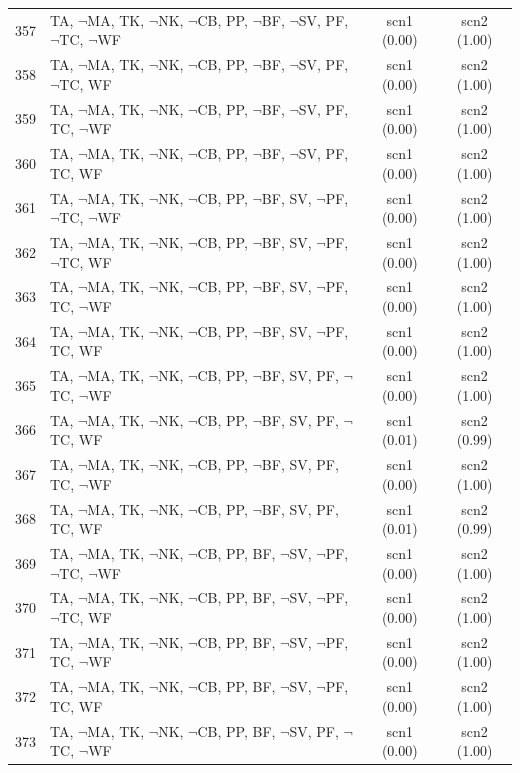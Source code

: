 \documentclass[12pt]{article}
\begin{document}
\begin{longtable}{|l|l|c|c|}
357 & TA, $\neg$MA, TK, $\neg$NK, $\neg$CB, PP, $\neg$BF, $\neg$SV, PF, $\neg$TC, $\neg$WF & scn1 (0.00) & scn2 (1.00)\\
358 & TA, $\neg$MA, TK, $\neg$NK, $\neg$CB, PP, $\neg$BF, $\neg$SV, PF, $\neg$TC, WF & scn1 (0.00) & scn2 (1.00)\\
359 & TA, $\neg$MA, TK, $\neg$NK, $\neg$CB, PP, $\neg$BF, $\neg$SV, PF, TC, $\neg$WF & scn1 (0.00) & scn2 (1.00)\\
360 & TA, $\neg$MA, TK, $\neg$NK, $\neg$CB, PP, $\neg$BF, $\neg$SV, PF, TC, WF & scn1 (0.00) & scn2 (1.00)\\
361 & TA, $\neg$MA, TK, $\neg$NK, $\neg$CB, PP, $\neg$BF, SV, $\neg$PF, $\neg$TC, $\neg$WF & scn1 (0.00) & scn2 (1.00)\\
362 & TA, $\neg$MA, TK, $\neg$NK, $\neg$CB, PP, $\neg$BF, SV, $\neg$PF, $\neg$TC, WF & scn1 (0.00) & scn2 (1.00)\\
363 & TA, $\neg$MA, TK, $\neg$NK, $\neg$CB, PP, $\neg$BF, SV, $\neg$PF, TC, $\neg$WF & scn1 (0.00) & scn2 (1.00)\\
364 & TA, $\neg$MA, TK, $\neg$NK, $\neg$CB, PP, $\neg$BF, SV, $\neg$PF, TC, WF & scn1 (0.00) & scn2 (1.00)\\
365 & TA, $\neg$MA, TK, $\neg$NK, $\neg$CB, PP, $\neg$BF, SV, PF, $\neg$TC, $\neg$WF & scn1 (0.00) & scn2 (1.00)\\
366 & TA, $\neg$MA, TK, $\neg$NK, $\neg$CB, PP, $\neg$BF, SV, PF, $\neg$TC, WF & scn1 (0.01) & scn2 (0.99)\\
367 & TA, $\neg$MA, TK, $\neg$NK, $\neg$CB, PP, $\neg$BF, SV, PF, TC, $\neg$WF & scn1 (0.00) & scn2 (1.00)\\
368 & TA, $\neg$MA, TK, $\neg$NK, $\neg$CB, PP, $\neg$BF, SV, PF, TC, WF & scn1 (0.01) & scn2 (0.99)\\
369 & TA, $\neg$MA, TK, $\neg$NK, $\neg$CB, PP, BF, $\neg$SV, $\neg$PF, $\neg$TC, $\neg$WF & scn1 (0.00) & scn2 (1.00)\\
370 & TA, $\neg$MA, TK, $\neg$NK, $\neg$CB, PP, BF, $\neg$SV, $\neg$PF, $\neg$TC, WF & scn1 (0.00) & scn2 (1.00)\\
371 & TA, $\neg$MA, TK, $\neg$NK, $\neg$CB, PP, BF, $\neg$SV, $\neg$PF, TC, $\neg$WF & scn1 (0.00) & scn2 (1.00)\\
372 & TA, $\neg$MA, TK, $\neg$NK, $\neg$CB, PP, BF, $\neg$SV, $\neg$PF, TC, WF & scn1 (0.00) & scn2 (1.00)\\
373 & TA, $\neg$MA, TK, $\neg$NK, $\neg$CB, PP, BF, $\neg$SV, PF, $\neg$TC, $\neg$WF & scn1 (0.00) & scn2 (1.00)\\

\end{longtable}
\end{document}
